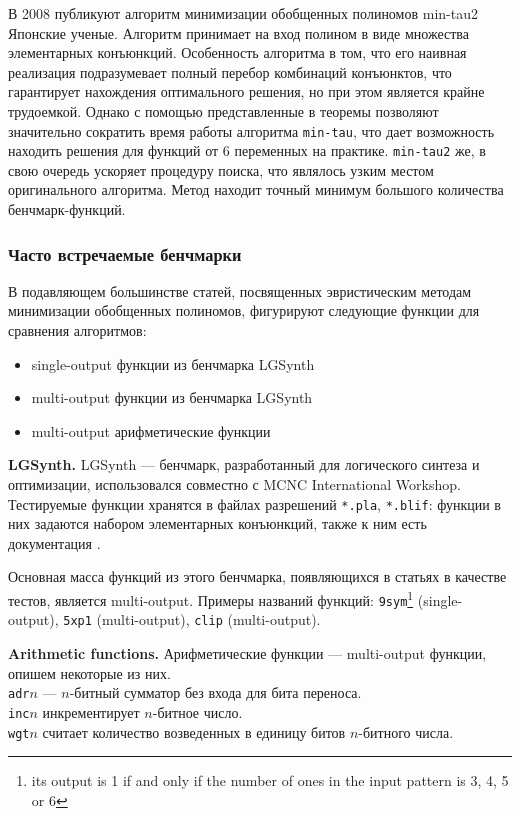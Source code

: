 \documentclass[a4paper,12pt,titlepage,finall]{article}
\begin{document}
В 2008 публикуют алгоритм минимизации обобщенных полиномов min-tau2 \cite{min-tau2} Японские ученые.
Алгоритм принимает на вход полином в виде множества элементарных конъюнкций. Особенность алгоритма в том, что его наивная реализация подразумевает полный перебор комбинаций конъюнктов, что гарантирует нахождения оптимального решения, но при этом является крайне трудоемкой. Однако с помощью представленные в \cite{min-tau} теоремы позволяют значительно сократить время работы алгоритма \texttt{min-tau}, что дает возможность находить решения для функций от 6 переменных на практике. \texttt{min-tau2} же, в свою очередь ускоряет процедуру поиска, что являлось узким местом оригинального алгоритма. Метод находит точный минимум большого количества бенчмарк-функций.

\subsubsection{Часто встречаемые бенчмарки}

В подавляющем большинстве статей, посвященных эвристическим методам минимизации обобщенных полиномов, фигурируют следующие функции для сравнения алгоритмов:
\begin{itemize}
    \item single-output функции из бенчмарка LGSynth
    \item multi-output функции из бенчмарка LGSynth
    \item multi-output арифметические функции
\end{itemize}

\textbf{LGSynth.}
LGSynth --- бенчмарк, разработанный для логического синтеза и оптимизации, использовался совместно с MCNC International Workshop. Тестируемые функции хранятся в файлах разрешений \texttt{*.pla}, \texttt{*.blif}: функции в них задаются набором элементарных конъюнкций, также к ним есть документация \cite{benchmark}.

Основная масса функций из этого бенчмарка, появляющихся в статьях в качестве тестов, является multi-output. Примеры названий функций: \texttt{9sym}\footnote{its output is 1 if and only if the number of ones in the input pattern is 3, 4, 5 or 6} (single-output), \texttt{5xp1} (multi-output), \texttt{clip} (multi-output).

\textbf{Arithmetic functions.}
Арифметические функции --- multi-output функции, опишем некоторые из них.\\
\texttt{adr}$ n $ --- $ n $-битный сумматор без входа для бита переноса.\\
\texttt{inc}$ n $ инкрементирует $ n $-битное число.\\
\texttt{wgt}$ n $ считает количество возведенных в единицу битов $ n $-битного числа.
\end{document}
